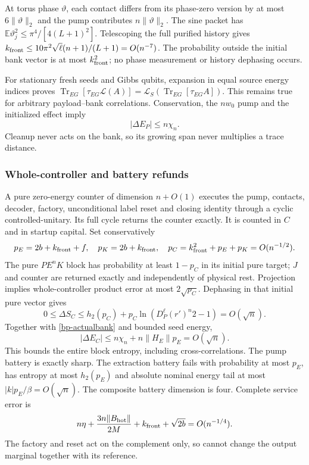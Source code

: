 \documentclass[11pt]{article}
\theoremstyle{definition}
\theoremstyle{remark}
\newcommand{\Tr}{\operatorname{Tr}}
\providecommand{\h}{h_2}
\begin{document}
At torus phase $\vartheta$, each contact differs from its phase-zero
version by at most $6\|\vartheta\|_2$ and the pump contributes
$n\|\vartheta\|_2$. The sine packet has
$\mathbb E\vartheta_j^2\le\pi^4/[4(L+1)^2]$. Telescoping the full
purified history gives
$k_{\rm front}\le10\pi^2\sqrt\ell(n+1)/(L+1)=O(n^{-7})$.
The probability outside the initial bank vector is at most
$k_{\rm front}^2$; no phase measurement or history dephasing occurs.

For stationary fresh seeds and Gibbs qubits, expansion in equal
source energy indices proves
$\Tr_{EG}[\tau_{EG}\mathcal L(A)]
=\mathcal L_S(\Tr_{EG}[\tau_{EG}A])$.
This remains true for arbitrary payload--bank correlations.
Conservation, the $nw_0$ pump and the initialized effect imply
\begin{equation}\label{bp-actualbank}
 |\Delta E_P|\le n\chi_n.
\end{equation}
Cleanup never acts on the bank, so its growing span never multiplies
a trace distance.

\subsubsection{Whole-controller and battery refunds}
A pure zero-energy counter of dimension $n+O(1)$ executes the pump,
contacts, decoder, factory, unconditional label reset and closing
identity through a cyclic controlled-unitary. Its full cycle returns
the counter exactly. It is counted in $C$ and in startup capital.
Set conservatively
\[
 p_E=2b+k_{\rm front}+f,\quad p_K=2b+k_{\rm front},\quad
 p_C=k_{\rm front}^2+p_E+p_K=O(n^{-1/2}).
\]
The pure $PE^nK$ block has probability at least $1-p_C$ in its initial
pure target; $J$ and counter are returned exactly and independently
of physical rest. Projection implies whole-controller product error
at most $2\sqrt{p_C}$. Dephasing in that initial pure vector gives
\[
 0\le\Delta S_C\le\h(p_C)+p_C\ln(D_P^\ell(r')^n2-1)=O(\sqrt n).
\]
Together with \eqref{bp-actualbank} and bounded seed energy,
\[
 |\Delta E_C|\le n\chi_n+n\|H_E\|p_E=O(\sqrt n).
\]
This bounds the entire block entropy, including cross-correlations.
The pump battery is exactly sharp. The extraction battery fails
with probability at most $p_E$, has entropy at most $\h(p_E)$ and
absolute nominal energy tail at most $|k|p_E/\beta=O(\sqrt n)$.
The composite battery dimension is four. Complete service error is
\[
 n\eta+\frac{3n\|B_{\rm hot}\|}{2M}
               +k_{\rm front}+\sqrt{2b}=O(n^{-1/4}).
\]
The factory and reset act on the complement only, so cannot change
the output marginal together with its reference.
\end{document}
